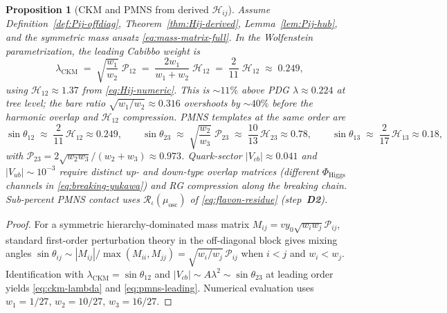 \documentclass[11pt]{article}
\theoremstyle{plain}
\newtheorem{proposition}[theorem]{Proposition}
\theoremstyle{definition}
\theoremstyle{remark}
\numberwithin{equation}{section}
\begin{document}
\begin{proposition}[CKM and PMNS from derived $\mathcal{H}_{ij}$]
\label{prop:ckm-hierarchy}
Assume Definition~\ref{def:Pij-offdiag}, Theorem~\ref{thm:Hij-derived},
Lemma~\ref{lem:Pij-hub}, and the symmetric mass ansatz \eqref{eq:mass-matrix-full}.
In the Wolfenstein parametrization, the leading Cabibbo weight is
\begin{equation}\label{eq:ckm-lambda}
  \lambda_{\mathrm{CKM}}
  \;=\;
  \sqrt{\frac{w_1}{w_2}}\;\mathcal{P}_{12}
  \;=\;
  \frac{2w_1}{w_1+w_2}\;\mathcal{H}_{12}
  \;=\;
  \frac{2}{11}\;\mathcal{H}_{12}
  \;\approx\;
  0.249,
\end{equation}
using $\mathcal{H}_{12}\approx 1.37$ from \eqref{eq:Hij-numeric}. This is
$\sim11\%$ above PDG $\lambda\approx0.224$ at tree level; the bare ratio
$\sqrt{w_1/w_2}\approx0.316$ overshoots by $\sim40\%$ before the harmonic
overlap and $\mathcal{H}_{12}$ compression. PMNS templates at the same order
are
\begin{equation}\label{eq:pmns-leading}
  \sin\theta_{12}
  \;\approx\;
  \frac{2}{11}\,\mathcal{H}_{12}\approx 0.249,
  \qquad
  \sin\theta_{23}
  \;\approx\;
  \sqrt{\frac{w_2}{w_3}}\;\mathcal{P}_{23}
  \;\approx\;
  \frac{10}{13}\,\mathcal{H}_{23}\approx 0.78,
  \qquad
  \sin\theta_{13}
  \;\approx\;
  \frac{2}{17}\,\mathcal{H}_{13}\approx 0.18,
\end{equation}
with $\mathcal{P}_{23}=2\sqrt{w_2w_3}/(w_2+w_3)\approx0.973$. Quark-sector
$|V_{cb}|\approx0.041$ and $|V_{ub}|\sim10^{-3}$ require distinct up- and
down-type overlap matrices (different $\Phi_{\mathrm{Higgs}}$ channels in
\eqref{eq:breaking-yukawa}) and RG compression along the breaking chain.
Sub-percent PMNS contact uses $\mathcal{R}_\iota(\mu_{\mathrm{osc}})$ of
\eqref{eq:flavon-residue} (step~\textbf{D2}).
\end{proposition}

\begin{proof}
For a symmetric hierarchy-dominated mass matrix
$M_{ij}=v y_0\sqrt{w_iw_j}\mathcal{P}_{ij}$, standard first-order perturbation
theory in the off-diagonal block gives mixing angles
$\sin\theta_{ij}\sim|M_{ij}|/\max(M_{ii},M_{jj})
=\sqrt{w_i/w_j}\,\mathcal{P}_{ij}$ when $i<j$ and $w_i<w_j$.
Identification with $\lambda_{\mathrm{CKM}}=\sin\theta_{12}$ and
$|V_{cb}|\sim A\lambda^2\sim\sin\theta_{23}$ at leading order yields
\eqref{eq:ckm-lambda} and \eqref{eq:pmns-leading}. Numerical evaluation uses
$w_1=1/27$, $w_2=10/27$, $w_3=16/27$.
\end{proof}
\end{document}
